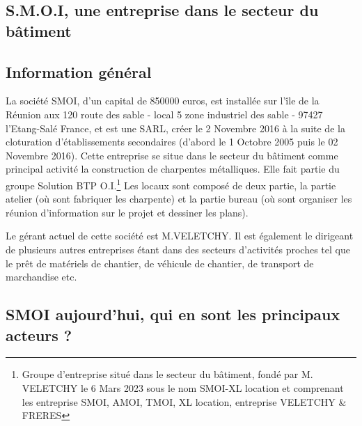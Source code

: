 \newpage
\begin{center}
    \section{S.M.O.I, une entreprise dans le secteur du bâtiment}
\end{center}

\subsection{Information général}

La société SMOI, d'un capital de 850000 euros, est installée sur l'île de la Réunion aux 120 route des sable - local 5 zone industriel des sable - 97427 l'Etang-Salé France, et est une SARL, créer le 2 Novembre 2016 à la suite de la cloturation d'établissements secondaires (d'abord le 1 Octobre 2005 puis le 02 Novembre 2016). Cette entreprise se situe dans le secteur du bâtiment comme principal activité la construction de charpentes métalliques. Elle fait partie du groupe Solution BTP O.I.\footnote{Groupe d'entreprise situé dans le secteur du bâtiment, fondé par M. VELETCHY le 6 Mars 2023 sous le nom SMOI-XL location et comprenant les entreprise SMOI, AMOI, TMOI, XL location, entreprise VELETCHY \& FRERES} \newline
Les locaux sont composé de deux partie, la partie atelier (où sont fabriquer les charpente) et la partie bureau (où sont organiser les réunion d'information sur le projet et dessiner les plans).\newline

Le gérant actuel de cette société est M.VELETCHY. Il est également le dirigeant de plusieurs autres entreprises étant dans des secteurs d'activités proches tel que le prêt de matériels de chantier, de véhicule de chantier, de transport de marchandise etc.



\subsection{SMOI aujourd'hui, qui en sont les principaux acteurs ?}

